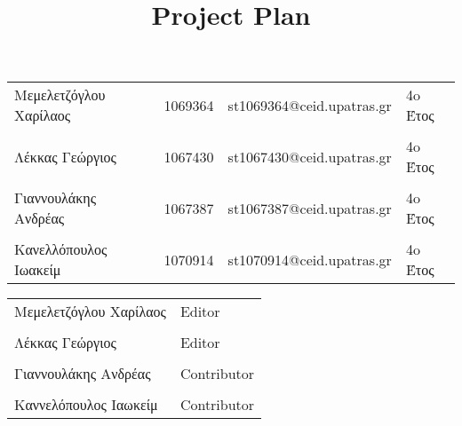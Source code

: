 \documentclass{../ol-softwaremanual}
\begin{document}
	
	
	\begin{titlepage}
		
		
		\title{\en Project Plan \\}
	\end{titlepage}
	
	
	\maketitle
	
	\newpage
	
	
	\vspace{20pt}
	
	
	
	\begin{table}[htbp!]
		
		\begin{tabular}{llll}
			Μεμελετζόγλου Χαρίλαος & 1069364 & \en st1069364@ceid.upatras.gr & 4o Έτος   \\ 
			\\ Λέκκας Γεώργιος      &      1067430    &   \en st1067430@ceid.upatras.gr & 4o Έτος  \\
			\\ Γιαννουλάκης Ανδρέας        &   1067387       & \en st1067387@ceid.upatras.gr & 4o Έτος           \\
			\\ Κανελλόπουλος Ιωακείμ        &  1070914        &    \en st1070914@ceid.upatras.gr & 4o Έτος        \\ 
		\end{tabular}
	\end{table}
	
	
	\vspace{20pt}
	
	\begin{table}[htbp!]
		\begin{tabular}{ll}
			Μεμελετζόγλου Χαρίλαος & \en Editor \\
			\\ Λέκκας Γεώργιος      &   \en  Editor \\
			\\ Γιαννουλάκης Ανδρέας & \en Contributor \\
			\\ Καννελόπουλος Ιαωκείμ & \en Contributor \\ 
		\end{tabular}
	\end{table}
	
\end{document}

